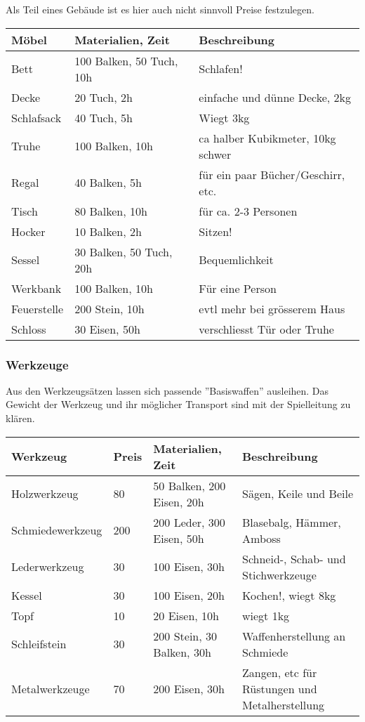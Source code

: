 \documentclass{article}
\begin{document}
Als Teil eines Gebäude ist es hier auch nicht sinnvoll Preise festzulegen.


\begin{small}
\begin{tabular}{|m{3cm}|m{4cm}|m{6cm}|}
\hline
\textbf{Möbel}&\textbf{Materialien, Zeit}&\textbf{Beschreibung}\\
\hline
\hline
Bett&100 Balken, 50 Tuch, 10h&Schlafen!\\
\hline
Decke&20 Tuch, 2h&einfache und dünne Decke, 2kg\\
\hline
Schlafsack&40 Tuch, 5h&Wiegt 3kg\\
\hline
Truhe&100 Balken, 10h&ca halber Kubikmeter, 10kg schwer\\
\hline
Regal&40 Balken, 5h&für ein paar Bücher/Geschirr, etc.\\
\hline
Tisch&80 Balken, 10h&für ca. 2-3 Personen\\
\hline
Hocker&10 Balken, 2h&Sitzen!\\
\hline
Sessel&30 Balken, 50 Tuch, 20h&Bequemlichkeit\\
\hline
Werkbank&100 Balken, 10h&Für eine Person\\
\hline
Feuerstelle&200 Stein, 10h&evtl mehr bei grösserem Haus\\
\hline
Schloss&30 Eisen, 50h&verschliesst Tür oder Truhe\\
\hline
\end{tabular}
\end{small}

\subsubsection{Werkzeuge}

Aus den Werkzeugsätzen lassen sich passende ''Basiswaffen'' ausleihen. Das Gewicht der Werkzeug und ihr möglicher
Transport sind mit der Spielleitung zu klären.


\begin{small}
\begin{tabular}{|m{3cm}|m{1cm}|m{4cm}|m{6cm}|}
\hline
\textbf{Werkzeug}&\textbf{Preis}&\textbf{Materialien, Zeit}&\textbf{Beschreibung}\\
\hline
\hline
Holzwerkzeug&80&50 Balken, 200 Eisen, 20h&Sägen, Keile und Beile\\
\hline
Schmiedewerkzeug&200&200 Leder, 300 Eisen, 50h&Blasebalg, Hämmer, Amboss\\
\hline
Lederwerkzeug&30&100 Eisen, 30h&Schneid-, Schab- und Stichwerkzeuge\\
\hline
Kessel&30&100 Eisen, 20h&Kochen!, wiegt 8kg\\
\hline
Topf&10&20 Eisen, 10h&wiegt 1kg\\
\hline
Schleifstein&30&200 Stein, 30 Balken, 30h&Waffenherstellung an Schmiede\\
\hline
Metalwerkzeuge&70&200 Eisen, 30h&Zangen, etc für Rüstungen und Metalherstellung\\
\hline
\end{tabular}
\end{small}
\end{document}
